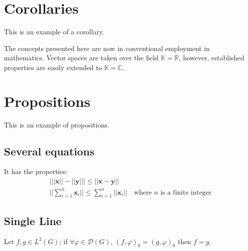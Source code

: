
\section{Corollaries}

This is an example of a corollary.

\begin{corollary}
The concepts presented here are now in conventional employment in mathematics. Vector spaces are taken over the field $\mathbb{K}=\mathbb{R}$, however, established properties are easily extended to $\mathbb{K}=\mathbb{C}$.
\end{corollary}


\section{Propositions}

This is an example of propositions.

\subsection{Several equations}

\begin{proposition}
It has the properties:
\begin{align}
& \big| ||\mathbf{x}|| - ||\mathbf{y}|| \big|\leq || \mathbf{x}- \mathbf{y}||\\
&  ||\sum_{i=1}^n\mathbf{x}_i||\leq \sum_{i=1}^n||\mathbf{x}_i||\quad\text{where $n$ is a finite integer}
\end{align}
\end{proposition}

\subsection{Single Line}

\begin{proposition} 
Let $f,g\in L^2(G)$; if $\forall \varphi\in\mathcal{D}(G)$, $(f,\varphi)_0=(g,\varphi)_0$ then $f = g$. 
\end{proposition}


